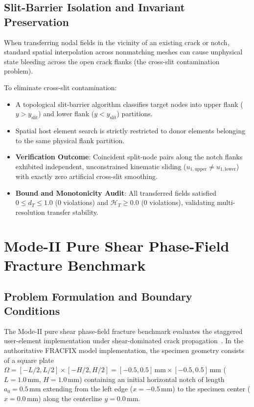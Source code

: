 \subsection{Slit-Barrier Isolation and Invariant Preservation}
When transferring nodal fields in the vicinity of an existing crack or notch, standard spatial interpolation across nonmatching meshes can cause unphysical state bleeding across the open crack flanks (the cross-slit contamination problem).

To eliminate cross-slit contamination:
\begin{itemize}
    \item A topological slit-barrier algorithm classifies target nodes into upper flank ($y > y_{\mathrm{slit}}$) and lower flank ($y < y_{\mathrm{slit}}$) partitions.
    \item Spatial host element search is strictly restricted to donor elements belonging to the same physical flank partition.
    \item \textbf{Verification Outcome}: Coincident split-node pairs along the notch flanks exhibited independent, unconstrained kinematic sliding ($u_{1,\mathrm{upper}} \neq u_{1,\mathrm{lower}}$) with exactly zero artificial cross-slit smoothing.
    \item \textbf{Bound and Monotonicity Audit}: All transferred fields satisfied $0 \le d_T \le 1.0$ ($0$ violations) and $\mathcal{H}_T \ge 0.0$ ($0$ violations), validating multi-resolution transfer stability.
\end{itemize}

\section{Mode-II Pure Shear Phase-Field Fracture Benchmark}
\label{sec:topo_mode_ii_formulation}

\subsection{Problem Formulation and Boundary Conditions}
The Mode-II pure shear phase-field fracture benchmark evaluates the staggered user-element implementation under shear-dominated crack propagation~\cite{ambati2015,molnar2017}. In the authoritative FRACFIX model implementation, the specimen geometry consists of a square plate $\Omega = [-L/2, L/2] \times [-H/2, H/2] = [-0.5, 0.5]\,\text{mm} \times [-0.5, 0.5]\,\text{mm}$ ($L = 1.0\,\text{mm}$, $H = 1.0\,\text{mm}$) containing an initial horizontal notch of length $a_0 = 0.5\,\text{mm}$ extending from the left edge ($x = -0.5\,\text{mm}$) to the specimen center ($x = 0.0\,\text{mm}$) along the centerline $y = 0.0\,\text{mm}$.

